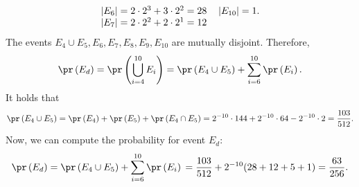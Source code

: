 \begin{enumerate}
\begin{align*}
\begin{tabular}{ll}
        $|E_6| = 2 \cdot 2^3 + 3 \cdot 2^2 = 28$    &$|E_{10}| = 1.$ \\
        $|E_7| = 2 \cdot 2^2 + 2 \cdot 2^1 = 12$    & \\
      \end{tabular}
    \end{align*}
    The events $E_4 \cup E_5, E_6, E_7, E_8, E_9, E_{10}$ are mutually disjoint.
    Therefore,
    \[ \pr\left(E_d\right) = \pr\left(\bigcup_{i=4}^{10} E_i\right)
      = \pr\left(E_4 \cup E_5 \right) + \sum_{i=6}^{10} \pr\left(E_i\right).\]
    It holds that
    \[
      \pr\left(E_4 \cup E_5 \right)
      = \pr\left(E_4\right) + \pr\left(E_5 \right) + \pr\left(E_4 \cap E_5 \right)
      = 2^{-10} \cdot 144 + 2^{-10} \cdot 64 - 2^{-10} \cdot 2
      = \frac{103}{512}.
    \]
    Now, we can compute the probability for event $E_d$:
    \[ \pr\left(E_d\right)
      = \pr\left(E_4 \cup E_5 \right) + \sum_{i=6}^{10} \pr\left(E_i\right) \\
      = \frac{103}{512} + 2^{-10}(28 + 12 + 5 + 1) \\
      = \frac{63}{256}.
    \]
\end{enumerate}

